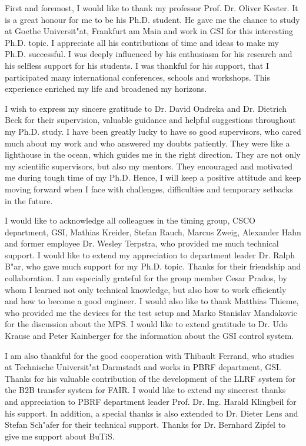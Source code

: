 First and foremost, I would like to thank my professor Prof. Dr. Oliver Kester. It is a great honour for me to be his Ph.D. student. He gave me the chance to study at Goethe Universit"at, Frankfurt am Main and work in GSI for this interesting Ph.D. topic. I appreciate all his contributions of time and ideas to make my Ph.D. successful. I was deeply influenced by his enthusiasm for his research and his selfless support for his students. I was thankful for his support, that I participated many international conferences, schools and workshops. This experience enriched my life and  
broadened my horizons.

I wish to express my sincere gratitude to Dr. David Ondreka and Dr. Dietrich Beck for their supervision, valuable guidance and helpful suggestions throughout my Ph.D. study. I have been greatly lucky to have so good supervisors, who cared much about my work and who answered my doubts patiently. They were like a lighthouse in the ocean, which guides me in the right direction. They are not only my  scientific supervisors, but also my mentors. They encouraged and motivated me during tough time of my Ph.D. Hence, I will keep a positive attitude and keep moving forward when I face with challenges, difficulties and temporary setbacks in the future.

I would like to acknowledge all colleagues in the timing group, \gls{CSCO} department, GSI, Mathias Kreider, Stefan Rauch, Marcus Zweig, Alexander Hahn and former employee Dr. Wesley Terpstra, who provided me much technical support. I would like to extend my appreciation to department leader Dr. Ralph B"ar, who gave much support for my Ph.D. topic. Thanks for their friendship and collaboration. I am especially grateful for the group member Cesar Prados, by whom I learned not only technical knowledge, but also how to work efficiently and how to become a good engineer. I would also like to thank Matthias Thieme, who provided me the devices for the test setup and Marko Stanislav Mandakovic for the discussion about the MPS. I would like to extend gratitude to Dr. Udo Krause and  Peter Kainberger for the information about the GSI control system.

I am also thankful for the good cooperation with Thibault Ferrand, who studies at Technische Universit"at Darmstadt and works in \gls{PBRF} department, GSI. Thanks for his valuable contribution of the development of the LLRF system for the B2B transfer system for FAIR. I would like to extend my sincerest thanks and appreciation to PBRF department leader Prof. Dr. Ing. Harald Klingbeil for his support. In addition, a special thanks is also extended to Dr. Dieter Lens and Stefan Sch"afer for their technical support. Thanks for Dr. Bernhard Zipfel to give me support about BuTiS.

